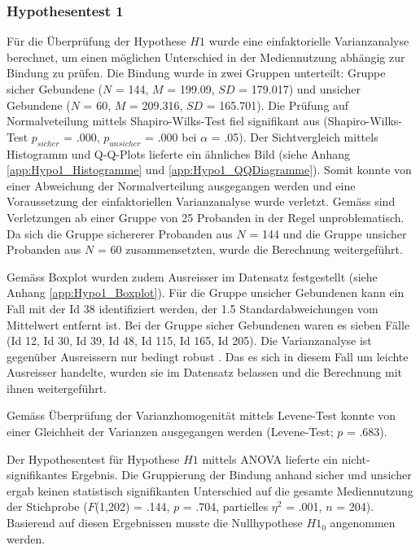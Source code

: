 \subsubsection{Hypothesentest 1}\label{sec:Hypothesentest1}
Für die Überprüfung der Hypothese $H1$ wurde eine einfaktorielle Varianzanalyse berechnet, um einen möglichen Unterschied in der Mediennutzung abhängig zur Bindung zu prüfen. Die Bindung wurde in zwei Gruppen unterteilt: Gruppe sicher Gebundene ($N$ = 144, $M$ = 199.09, $SD$ = 179.017) und unsicher Gebundene ($N$ = 60, $M$ = 209.316, $SD$ = 165.701). Die Prüfung auf Normalveteilung mittels Shapiro-Wilks-Test \cite{Shapiro1965} fiel signifikant aus (Shapiro-Wilks-Test $p_{sicher}$ = .000, $p_{unsicher}$ = .000 bei $\alpha$ = .05). Der Sichtvergleich mittels Histogramm und Q-Q-Plots lieferte ein ähnliches Bild (siehe Anhang \ref{app:Hypo1_Histogramme} und \ref{app:Hypo1_QQDiagramme}). Somit konnte von einer Abweichung der Normalverteilung ausgegangen werden \cite{Hemmerich2018} und eine Voraussetzung der einfaktoriellen Varianzanalyse wurde verletzt. Gemäss  sind Verletzungen ab einer Gruppe von 25 Probanden in der Regel unproblematisch. Da sich die Gruppe sichererer Probanden aus $N$ = 144 und die Gruppe unsicher Probanden aus $N$ = 60 zusammensetzten, wurde die Berechnung weitergeführt.

Gemäss Boxplot wurden zudem Ausreisser im Datensatz festgestellt (siehe Anhang \ref{app:Hypo1_Boxplot}). Für die Gruppe unsicher Gebundenen kann ein Fall mit der Id 38 identifiziert werden, der 1.5 Standardabweichungen vom Mittelwert entfernt ist. Bei der Gruppe sicher Gebundenen waren es sieben Fälle (Id 12, Id 30, Id 39, Id 48, Id 115, Id 165, Id 205). Die Varianzanalyse ist gegenüber Ausreissern nur bedingt robust \cite{Hemmerich2018}. Das es sich in diesem Fall um leichte Ausreisser handelte, wurden sie im Datensatz belassen und die Berechnung mit ihnen weitergeführt.  

Gemäss Überprüfung der Varianzhomogenität mittels Levene-Test konnte von einer Gleichheit der Varianzen ausgegangen werden (Levene-Test; $p$ = .683). 

Der Hypothesentest für Hypothese $H1$ mittels ANOVA lieferte ein nicht-signifikantes Ergebnis. Die Gruppierung der Bindung anhand sicher und unsicher ergab keinen statistisch signifikanten Unterschied auf die gesamte Mediennutzung der Stichprobe ($F$(1,202) = .144, $p$ = .704, partielles $\eta^2$ = .001, $n$ = 204). Basierend auf diesen Ergebnissen musste die Nullhypothese $H1_{0}$ angenommen werden. 

